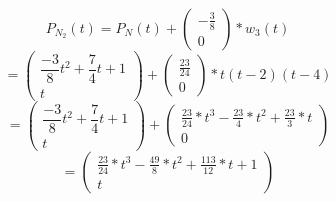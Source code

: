 \begin{tikzpicture}[grow=left,
level 1/.style={sibling distance=15mm},edge from parent/.style={-,draw},>=latex, level 3/.style={edge from child/.style={->,draw},sibling distance=15mm}]
\end{tikzpicture}\\

$$P_{N_2}(t) = P_{N}(t) + \begin{pmatrix}-\frac{3}{8}\\0\end{pmatrix} * w_3(t)$$
$$= \begin{pmatrix}\dfrac{-3}{8}t^2 +\dfrac{7}{4}t + 1\\t\end{pmatrix} + \begin{pmatrix}\frac{23}{24}\\0\end{pmatrix} * t(t-2)(t-4)$$
$$= \begin{pmatrix}\dfrac{-3}{8}t^2 +\dfrac{7}{4}t + 1\\t\end{pmatrix} + \begin{pmatrix}\frac{23}{24} * t^3 - \frac{23}{4} * t^2 + \frac{23}{3} * t\\0\end{pmatrix} $$
$$= \begin{pmatrix}\frac{23}{24} * t^3 - \frac{49}{8} * t^2 + \frac{113}{12} * t + 1\\t\end{pmatrix}$$